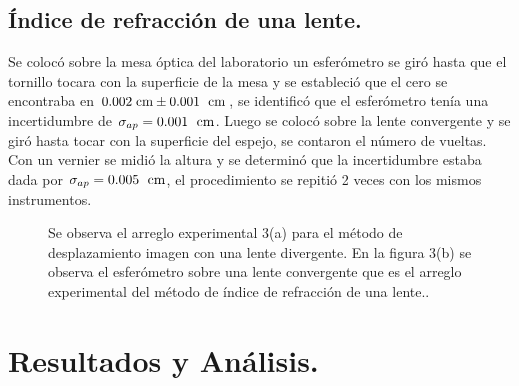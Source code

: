\documentclass[DIV=calc, paper=a4, fontsize=10pt]{scrartcl}
\begin{document}
\subsection*{\textcolor{carmine}{Índice de refracción de una lente.}}
Se colocó sobre la mesa óptica del laboratorio un esferómetro  se giró hasta que el tornillo tocara con la superficie de la mesa y se estableció que el cero se encontraba en $0.002\hspace{0.1cm}\text{cm}\pm0.001\hspace{0.1cm}\text{ cm}$, se identificó que el esferómetro tenía una incertidumbre de $\sigma_{ap}=0.001\hspace{0.1cm}\text{ cm}$. Luego se colocó sobre la lente convergente y se giró hasta tocar con la superficie del espejo, se contaron el número de vueltas. Con un vernier se midió la altura y se determinó que la incertidumbre estaba dada por $\sigma_{ap}=0.005\hspace{0.1cm}\text{ cm}$, el procedimiento se repitió 2 veces con los mismos instrumentos. 
\begin{figure}[H]
    \centering
 \caption{Se observa el arreglo experimental 3(a) para el método de desplazamiento imagen con una lente divergente. En la figura 3(b) se observa el esferómetro sobre una lente convergente que es el arreglo experimental del método de índice de refracción de una lente..}
 \label{f:Desarrollo experimental}
\end{figure}
\section*{\textcolor{carmine}{Resultados y Análisis.}}
\end{document}
